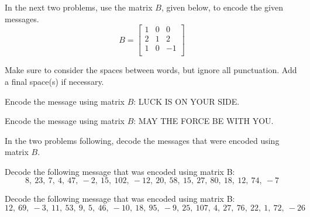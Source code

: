 In the next two problems, use the matrix $B$, given below, to encode the given messages.
\[
    B = \begin{bmatrix}
        1 & 0 & 0  \\
        2 & 1 & 2  \\
        1 & 0 & -1 \\
    \end{bmatrix}
\]

Make sure to consider the spaces between words, but ignore all punctuation. Add a final space(s) if
necessary.

\begin{puzzle}
    Encode the message using matrix $B$:
    LUCK IS ON YOUR SIDE.
\end{puzzle}


\begin{puzzle}
    Encode the message using matrix $B$:
    MAY THE FORCE BE WITH YOU.
\end{puzzle}

In the two problems following, decode the messages that were encoded using matrix $B$.

\begin{puzzle}
    Decode the following message that was encoded using matrix B:
    \[
        8,~ 23,~ 7,~ 4,~ 47,~ -2,~ 15,~ 102,~ -12,~ 20,~ 58,~ 15,~ 27,~ 80,~ 18,~ 12,~ 74,~ -7
    \]
\end{puzzle}

\begin{puzzle}
    Decode the following message that was encoded using matrix B:
    \[
        12,~ 69,~ -3,~ 11,~ 53,~ 9,~ 5,~ 46,~ -10,~ 18,~ 95,~ -9,~ 25,~ 107,~ 4,~ 27,~ 76,~ 22,~ 1,~ 72,~ -26
    \]
\end{puzzle}





